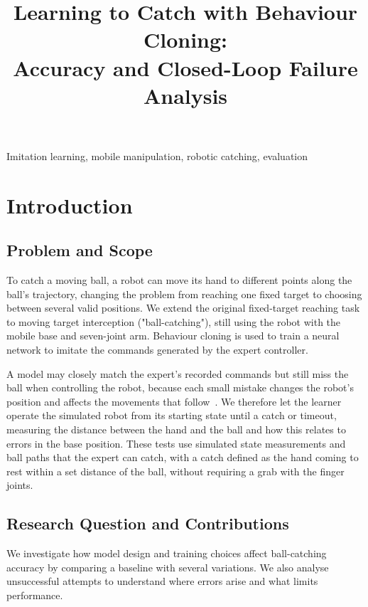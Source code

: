 \documentclass[conference]{IEEEtran}
\title{Learning to Catch with Behaviour Cloning:\\
Accuracy and Closed-Loop Failure Analysis}
\author{\IEEEauthorblockN{William Boyd, Nick Wright, Yiyan Wang}
\IEEEauthorblockA{University College London\\London, United Kingdom}}
\begin{document}
\maketitle

\begin{abstract}
\end{abstract}

\begin{IEEEkeywords}
Imitation learning, mobile manipulation, robotic catching, evaluation
\end{IEEEkeywords}

\section{Introduction}
\subsection{Problem and Scope}
To catch a moving ball, a robot can move its hand to different points along the ball’s trajectory, changing the problem from reaching one fixed target to choosing between several valid positions. We extend the original fixed-target reaching task to moving target interception ("ball-catching"), still using the robot with the mobile base and seven-joint arm. Behaviour cloning is used to train a neural network to imitate the commands generated by the expert controller.

A model may closely match the expert’s recorded commands but still miss the ball when controlling the robot, because each small mistake changes the robot’s position and affects the movements that follow~\cite{ross2011}. We therefore let the learner operate the simulated robot from its starting state until a catch or timeout, measuring the distance between the hand and the ball and how this relates to errors in the base position. These tests use simulated state measurements and ball paths that the expert can catch, with a catch defined as the hand coming to rest within a set distance of the ball, without requiring a grab with the finger joints.

\subsection{Research Question and Contributions}
We investigate how model design and training choices affect ball-catching accuracy by comparing a baseline with several variations. We also analyse unsuccessful attempts to understand where errors arise and what limits performance.
\end{document}
